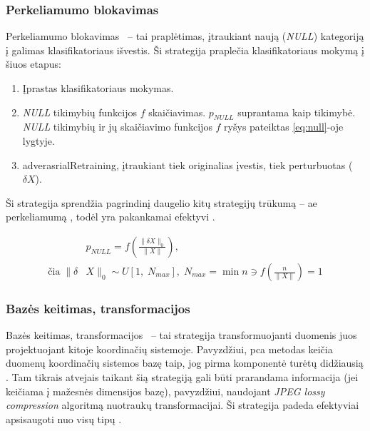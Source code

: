 \def\strat{Perkeliamumo blokavimas}
\subsubsection{\strat}\label{sec:literature:defense:blocking}

\strat~ -- tai   praplėtimas, įtraukiant naują (\textit{NULL}) kategoriją į galimas klasifikatoriaus išvestis. Ši strategija praplečia klasifikatoriaus mokymą į šiuos etapus:
\begin{enumerate}
    \item Įprastas klasifikatoriaus mokymas.
    \item \textit{NULL} tikimybių funkcijos $f$ skaičiavimas. $p_{NULL}$ suprantama kaip  tikimybė. \textit{NULL} tikimybių ir jų skaičiavimo funkcijos $f$ ryšys pateiktas \ref{eq:null}-oje lygtyje.
    \item \Gls{adverasrialRetraining}, įtraukiant tiek originalias įvestis, tiek perturbuotas ($\delta X$).
\end{enumerate}

Ši strategija sprendžia pagrindinį daugelio kitų strategijų trūkumą -- \gls{ae} perkeliamumą , todėl yra pakankamai efektyvi \cite{chakrabortySurveyAdversarialAttacks2021}.

\begin{equation}\label{eq:null}
    \begin{split}
        &p_{NULL} = f\left(\frac{\| \delta X \|_0}{\|X\|}\right),\\
        \text{čia}\; \| \delta
        &X \|_0 \sim U[1,\; N_{max}], \; N_{max} = \min n \ni f\left(\frac{n}{\|X\|}\right)
        = 1
    \end{split}
\end{equation}



\def\strat{Bazės keitimas, transformacijos}
\subsubsection{\strat}\label{sec:literature:defense:basis}

\strat~ -- tai strategija transformuojanti duomenis juos projektuojant kitoje koordinačių sistemoje. Pavyzdžiui, \gls{pca} metodas keičia duomenų koordinačių sistemos bazę taip, jog pirma komponentė turėtų didžiausią . Tam tikrais atvejais taikant šią strategiją gali būti prarandama informacija (jei keičiama į mažesnės dimensijos bazę), pavyzdžiui, naudojant \textit{JPEG lossy compression} algoritmą nuotraukų transformacijai. Ši strategija padeda efektyviai apsisaugoti nuo visų tipų  \cite{chakrabortySurveyAdversarialAttacks2021}.